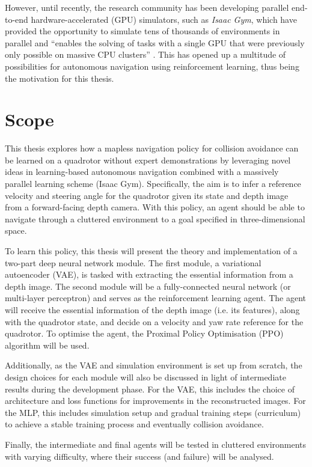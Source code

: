However, until recently, the research community has been developing parallel end-to-end hardware-accelerated (GPU) simulators, such as \textit{Isaac Gym}, which have provided the opportunity to simulate tens of thousands of environments in parallel and ``enables the solving of tasks with a single GPU that were previously only possible on massive CPU clusters'' \cite{IsaacGym}. This has opened up a multitude of possibilities for autonomous navigation using reinforcement learning, thus being the motivation for this thesis.


\section{Scope}
This thesis explores how a mapless navigation policy for collision avoidance can be learned on a quadrotor without expert demonstrations by leveraging novel ideas in learning-based autonomous navigation combined with a massively parallel learning scheme (Isaac Gym). 
Specifically, the aim is to infer a reference velocity and steering angle for the quadrotor given its state and depth image from a forward-facing depth camera. With this policy, an agent should be able to navigate through a cluttered environment to a goal specified in three-dimensional space.

To learn this policy, this thesis will present the theory and implementation of a two-part deep neural network module. The first module, a variational autoencoder (VAE), is tasked with extracting the essential information from a depth image. The second module will be a fully-connected neural network (or multi-layer perceptron) and serves as the reinforcement learning agent. The agent will receive the essential information of the depth image (i.e. its features), along with the quadrotor state, and decide on a velocity and yaw rate reference for the quadrotor. To optimise the agent, the Proximal Policy Optimisation (PPO) algorithm will be used. 

Additionally, as the VAE and simulation environment is set up from scratch, the design choices for each module will also be discussed in light of intermediate results during the development phase.
For the VAE, this includes the choice of architecture and loss functions for improvements in the reconstructed images.
For the MLP, this includes simulation setup and gradual training steps (curriculum) to achieve a stable training process and eventually collision avoidance.

Finally, the intermediate and final agents will be tested in cluttered environments with varying difficulty, where their success (and failure) will be analysed. 

